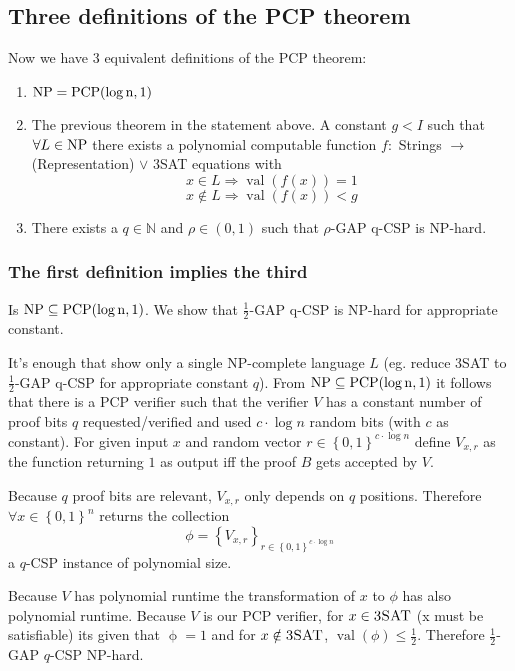 \documentclass[a4paper]{article}
\newcommand{\cls}[1]{\rm{#1}}
\newcommand{\probl}[1]{\text{\textsc{#1}}}
\newcommand{\set}[1]{\left\{#1\right\}}
\begin{document}
\subsection{Three definitions of the PCP theorem}
%
Now we have 3 equivalent definitions of the PCP theorem:
\begin{enumerate}
  \item $\cls{NP} = \cls{PCP}(\log{n}, 1)$
  \item
    The previous theorem in the statement above.
    A constant $g < I$ such that $\forall L \in \cls{NP}$
    there exists a polynomial computable function $f:$
    Strings $\rightarrow$ (Representation) $\lor$ 3SAT
    equations with
    \[
      x \in L \Rightarrow \operatorname{val}(f(x)) = 1
    \] \[
      x \notin L \Rightarrow \operatorname{val}(f(x)) < g
    \]
  \item There exists a $q \in \mathbb{N}$ and $\rho \in (0,1)$ such that
        $\rho$-GAP q-CSP is \cls{NP}-hard.
\end{enumerate}

\subsubsection{The first definition implies the third}
%
Is $\cls{NP} \subseteq \cls{PCP}(\log{n}, 1)$.
We show that $\frac12$-GAP q-CSP is \cls{NP}-hard for appropriate constant.

It's enough that show only a single \cls{NP}-complete language $L$
(eg. reduce 3SAT to $\frac12$-GAP q-CSP for appropriate constant
$q$). From $\cls{NP} \subseteq \cls{PCP}(\log{n}, 1)$ it follows that
there is a PCP verifier such that the verifier $V$ has a constant number
of proof bits $q$ requested/verified and used $c\cdot \log{n}$ random bits
(with $c$ as constant). For given input $x$ and random vector $r \in
\set{0,1}^{c\cdot\log{n}}$ define $V_{x,r}$ as the function returning
$1$ as output iff the proof $B$ gets accepted by $V$.

Because $q$ proof bits are relevant, $V_{x,r}$ only depends on $q$ positions.
Therefore $\forall x \in \set{0,1}^n$ returns the collection
\[
  \phi = \set{V_{x,r}}_{r \in \set{0,1}^{c\cdot\log{n}}}
\]
a $q$-CSP instance of polynomial size.

Because $V$ has polynomial runtime the transformation of $x$ to $\phi$ has
also polynomial runtime. Because $V$ is our PCP verifier, for $x \in \probl{3SAT}$
(x must be satisfiable) its given that $\operatorname{\phi} = 1$ and for
$x \notin \probl{3SAT}$, $\operatorname{val}(\phi) \leq \frac12$.
Therefore $\frac12$-GAP $q$-CSP \cls{NP}-hard.
\end{document}

